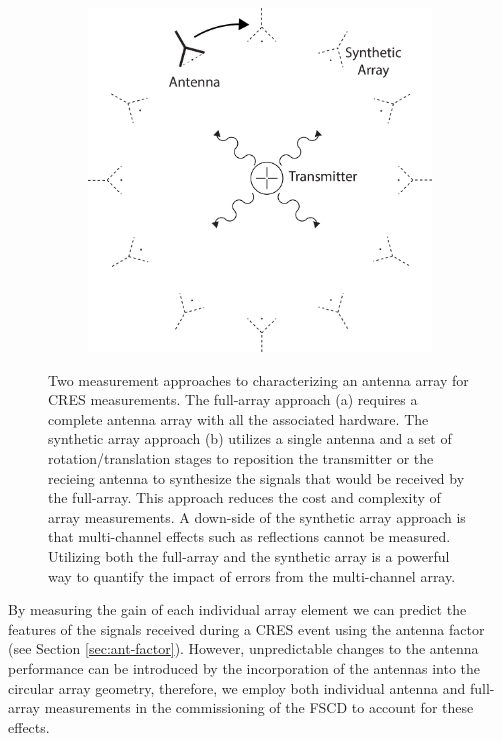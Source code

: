 \begin{figure}[htbp]
\begin{subfigure}[b]{0.4\textwidth}
        \includegraphics[width=1\textwidth]{figs/Chapter-5/230409_beamform_synth_array_meas.png}
        \caption{\label{fig:beam-synth-array-meas}}
    \end{subfigure}
    \hfill
    \caption{Two measurement approaches to characterizing an antenna array for CRES measurements. The full-array approach (a) requires a complete antenna array with all the associated hardware. The synthetic array approach (b) utilizes a single antenna and a set of rotation/translation stages to reposition the transmitter or the recieing antenna to synthesize the signals that would be received by the full-array. This approach reduces the cost and complexity of array measurements. A down-side of the synthetic array approach is that multi-channel effects such as reflections cannot be measured. Utilizing both the full-array and the synthetic array is a powerful way to quantify the impact of errors from the multi-channel array.}
    \qquad
    \label{fig:array-measurements}
\end{figure}

By measuring the gain of each individual array element we can predict the features of the signals received during a CRES event using the antenna factor (see Section \ref{sec:ant-factor}). However, unpredictable changes to the antenna performance can be introduced by the incorporation of the antennas into the circular array geometry, therefore, we employ both individual antenna and full-array measurements in the commissioning of the FSCD to account for these effects.

